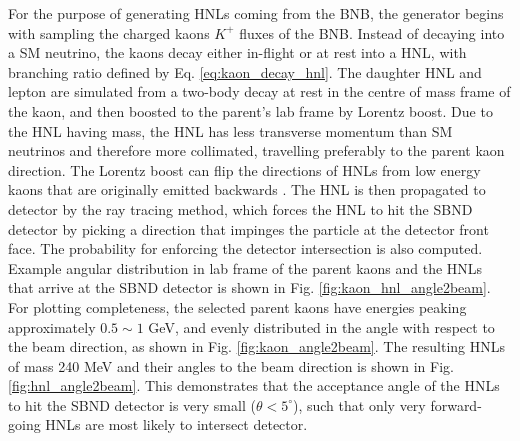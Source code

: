For the purpose of generating HNLs coming from the BNB, the generator begins with sampling the charged kaons $K^{+}$ fluxes of the BNB.
Instead of decaying into a SM neutrino, the kaons decay either in-flight or at rest into a HNL, with branching ratio defined by Eq. \ref{eq:kaon_decay_hnl}.
The daughter HNL and lepton are simulated from a two-body decay at rest in the centre of mass frame of the kaon, and then boosted to the parent's lab frame by Lorentz boost.
Due to the HNL having mass, the HNL has less transverse momentum than SM neutrinos and therefore more collimated, travelling preferably to the parent kaon direction.
The Lorentz boost can flip the directions of HNLs from low energy kaons that are originally emitted backwards \cite{DavidePhD}.
The HNL is then propagated to detector by the ray tracing method, which forces the HNL to hit the SBND detector by picking a direction that impinges the particle at the detector front face.
The probability for enforcing the detector intersection is also computed.
Example angular distribution in lab frame of the parent kaons and the HNLs that arrive at the SBND detector is shown in Fig. \ref{fig:kaon_hnl_angle2beam}.
For plotting completeness, the selected parent kaons have energies peaking approximately $0.5\sim1$ GeV, and evenly distributed in the angle with respect to the beam direction, as shown in Fig. \ref{fig:kaon_angle2beam}.
The resulting HNLs of mass 240 MeV and their angles to the beam direction is shown in Fig. \ref{fig:hnl_angle2beam}.
This demonstrates that the acceptance angle of the HNLs to hit the SBND detector is very small ($\theta < 5^\circ$), such that only very forward-going HNLs are most likely to intersect detector.

